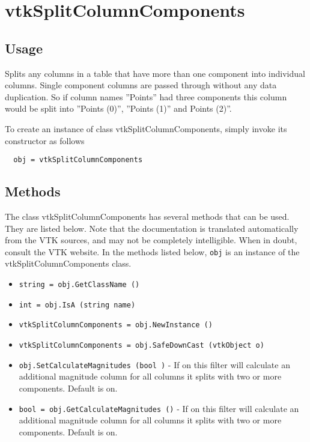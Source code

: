 \section{vtkSplitColumnComponents}

\subsection{Usage}

 Splits any columns in a table that have more than one component into
 individual columns. Single component columns are passed through without
 any data duplication. So if column names ''Points'' had three components
 this column would be split into ''Points (0)'', ''Points (1)'' and Points (2)''.

To create an instance of class vtkSplitColumnComponents, simply
invoke its constructor as follows
\begin{verbatim}
  obj = vtkSplitColumnComponents
\end{verbatim}
\subsection{Methods}

The class vtkSplitColumnComponents has several methods that can be used.
  They are listed below.
Note that the documentation is translated automatically from the VTK sources,
and may not be completely intelligible.  When in doubt, consult the VTK website.
In the methods listed below, \verb|obj| is an instance of the vtkSplitColumnComponents class.
\begin{itemize}
\item  \verb|string = obj.GetClassName ()|

\item  \verb|int = obj.IsA (string name)|

\item  \verb|vtkSplitColumnComponents = obj.NewInstance ()|

\item  \verb|vtkSplitColumnComponents = obj.SafeDownCast (vtkObject o)|

\item  \verb|obj.SetCalculateMagnitudes (bool )| -  If on this filter will calculate an additional magnitude column for all
 columns it splits with two or more components.
 Default is on.

\item  \verb|bool = obj.GetCalculateMagnitudes ()| -  If on this filter will calculate an additional magnitude column for all
 columns it splits with two or more components.
 Default is on.

\end{itemize}
